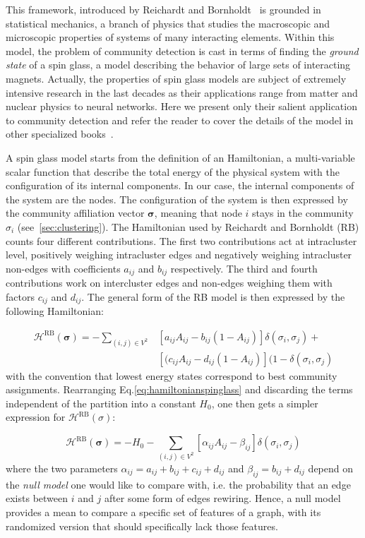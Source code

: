 This framework, introduced by Reichardt and Bornholdt~\cite{reichardt2006} is grounded in statistical mechanics, a branch of physics that studies the macroscopic and microscopic properties of systems of many interacting elements. Within this model, the problem of community detection is cast in terms of finding the \emph{ground state} of a spin glass, a model describing the behavior of large sets of interacting magnets.
Actually, the properties of spin glass models are subject of extremely intensive research in the last decades as their applications range from matter and nuclear physics to neural networks. Here we present only their salient application to community detection and refer the reader to cover the details of the model in other specialized books~\cite{Mezard1990}.

A spin glass model starts from the definition of an Hamiltonian, a multi-variable scalar function that describe the total energy of the physical system with the configuration of its internal components. In our case, the internal components of the system are the nodes. The configuration of the system is then expressed by the community affiliation vector $\boldsymbol\sigma$, meaning that node $i$ stays in the community $\sigma_i$ (see~\ref{sec:clustering}).
The Hamiltonian used by Reichardt and Bornholdt (RB) counts four different contributions. The first two contributions act at intracluster level, positively weighing intracluster edges and negatively weighing intracluster non-edges with coefficients $a_{ij}$ and $b_{ij}$ respectively. The third and fourth contributions work on intercluster edges and non-edges  weighing them with factors $c_{ij}$ and $d_{ij}$. The general form of the RB model is then expressed by the following Hamiltonian:

\begin{align}\label{eq:hamiltonianspinglass}
\mathcal{H}^{\textrm{RB}}(\boldsymbol \sigma) = - \sum_{(i,j)\in V^2} & \left[ a_{ij} A_{ij} - b_{ij}(1-A_{ij}) \right] \delta(\sigma_i,\sigma_j) + \nonumber \\ &  \left[ (c_{ij} A_{ij} - d_{ij}(1-A_{ij}) \right] (1-\delta(\sigma_i,\sigma_j)
\end{align}
with the convention that lowest energy states correspond to best community assignments.
Rearranging Eq.\ref{eq:hamiltonianspinglass} and discarding the terms independent of the partition into a constant $H_0$, one then gets a simpler expression for $\mathcal{H}^{\textrm{RB}}(\sigma)$:

\begin{equation}\label{eq:rbspinglass}
\mathcal{H}^{\textrm{RB}}(\boldsymbol \sigma) = -H_0 - \sum \limits_{(i,j)\in V^2} \left[ \alpha_{ij} A_{ij} - \beta_{ij} \right] \delta(\sigma_i,\sigma_j)
\end{equation}
where the two parameters $\alpha_{ij}=a_{ij}+b_{ij}+c_{ij}+d_{ij}$ and $\beta_{ij}=b_{ij}+d_{ij}$ depend on the \emph{null model} one would like to compare with, i.e. the probability that an edge exists between $i$ and $j$ after some form of edges rewiring. Hence, a null model provides a mean to compare a specific set of features of a graph, with its randomized version that should specifically lack those features.


